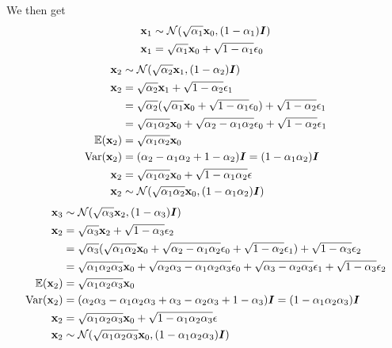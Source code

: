 We then get
\begin{align*}
    {\mathbf{x}}_1 &\sim \mathcal{N}(\sqrt{\alpha_1} {\mathbf{x}}_0, (1 -\alpha_1) {\bm{I}}) \\
    {\mathbf{x}}_1 &= \sqrt{\alpha_1} {\mathbf{x}}_0 + \sqrt{1 -\alpha_1} {\mathbf{\epsilon}}_0 \\
\end{align*}
\begin{align*}
    {\mathbf{x}}_2 &\sim \mathcal{N}(\sqrt{\alpha_2} {\mathbf{x}}_1, (1 -\alpha_2) {\bm{I}}) \\
    {\mathbf{x}}_2 &= \sqrt{\alpha_2} {\mathbf{x}}_1 + \sqrt{1 -\alpha_2} {\mathbf{\epsilon}}_1 \\
    &= \sqrt{\alpha_2}(\sqrt{\alpha_1} {\mathbf{x}}_0 + \sqrt{1 -\alpha_1} {\mathbf{\epsilon}}_0) + \sqrt{1 -\alpha_2} {\mathbf{\epsilon}}_1\\
    &= \sqrt{\alpha_1\alpha_2} {\mathbf{x}}_0 + \sqrt{\alpha_2 -\alpha_1\alpha_2} {\mathbf{\epsilon}}_0 + \sqrt{1 -\alpha_2} {\mathbf{\epsilon}}_1 \\
    \mathbb{E}({\mathbf{x}}_2) &= \sqrt{\alpha_1\alpha_2} {\mathbf{x}}_0 \\
    \mathrm{Var}({\mathbf{x}}_2) &= (\alpha_2 -\alpha_1\alpha_2 + 1 - \alpha_2) {\bm{I}} = (1 - \alpha_1\alpha_2) {\bm{I}} \\
    {\mathbf{x}}_2 &= \sqrt{\alpha_1\alpha_2} {\mathbf{x}}_0 + \sqrt{1 - \alpha_1\alpha_2} {\mathbf{\epsilon}} \\
    {\mathbf{x}}_2 &\sim \mathcal{N}(\sqrt{\alpha_1\alpha_2} {\mathbf{x}}_0, (1 - \alpha_1\alpha_2) {\bm{I}})
\end{align*}
\begin{align*}
    {\mathbf{x}}_3 &\sim \mathcal{N}(\sqrt{\alpha_3} {\mathbf{x}}_2, (1 -\alpha_3) {\bm{I}}) \\
    {\mathbf{x}}_2 &= \sqrt{\alpha_3} {\mathbf{x}}_2 + \sqrt{1 -\alpha_3} {\mathbf{\epsilon}}_2 \\
    &= \sqrt{\alpha_3}(\sqrt{\alpha_1\alpha_2} {\mathbf{x}}_0 + \sqrt{\alpha_2 -\alpha_1\alpha_2} {\mathbf{\epsilon}}_0 + \sqrt{1 -\alpha_2} {\mathbf{\epsilon}}_1) + \sqrt{1 -\alpha_3} {\mathbf{\epsilon}}_2\\
    &= \sqrt{\alpha_1\alpha_2\alpha_3} {\mathbf{x}}_0 + \sqrt{\alpha_2\alpha_3 -\alpha_1\alpha_2\alpha_3} {\mathbf{\epsilon}}_0 + \sqrt{\alpha_3 -\alpha_2\alpha_3} {\mathbf{\epsilon}}_1 + \sqrt{1 -\alpha_3} {\mathbf{\epsilon}}_2\\
    \mathbb{E}({\mathbf{x}}_2) &= \sqrt{\alpha_1\alpha_2\alpha_3} {\mathbf{x}}_0 \\
    \mathrm{Var}({\mathbf{x}}_2) &= (\alpha_2\alpha_3 -\alpha_1\alpha_2\alpha_3 + \alpha_3 -\alpha_2\alpha_3 + 1 -\alpha_3) {\bm{I}} = (1 - \alpha_1\alpha_2\alpha_3) {\bm{I}} \\
    {\mathbf{x}}_2 &= \sqrt{\alpha_1\alpha_2\alpha_3} {\mathbf{x}}_0 + \sqrt{1 - \alpha_1\alpha_2\alpha_3} {\mathbf{\epsilon}} \\
    {\mathbf{x}}_2 &\sim \mathcal{N}(\sqrt{\alpha_1\alpha_2\alpha_3} {\mathbf{x}}_0, (1 - \alpha_1\alpha_2\alpha_3) {\bm{I}})
\end{align*}
